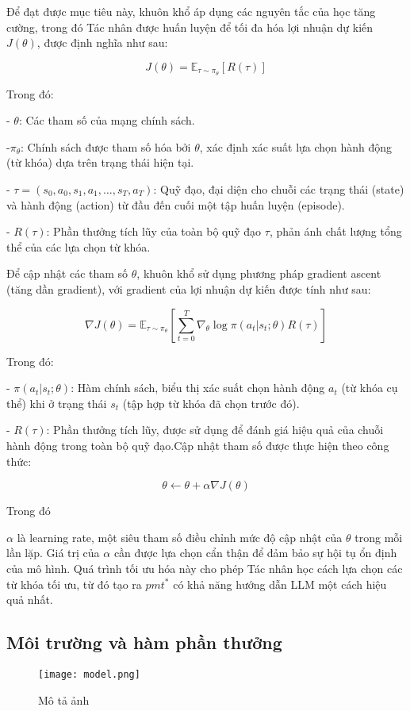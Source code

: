 \documentclass[a4paper,10pt]{article}
\begin{document}
Để đạt được mục tiêu này, khuôn khổ áp dụng các nguyên tắc của học tăng cường, trong đó Tác nhân được huấn luyện để tối đa hóa lợi nhuận dự kiến \(J(\theta)\), được định nghĩa như sau:

\[
J(\theta) = \mathbb{E}_{\tau \sim \pi_\theta} \left[ R(\tau) \right]
\]

Trong đó:

- \(\theta\): Các tham số của mạng chính sách.

-\(\pi_\theta\): Chính sách được tham số hóa bởi \(\theta\), xác định xác suất lựa chọn hành động (từ khóa) dựa trên trạng thái hiện tại.

- \(\tau = (s_0, a_0, s_1, a_1, \ldots, s_T, a_T)\): Quỹ đạo, đại diện cho chuỗi các trạng thái (state) và hành động (action) từ đầu đến cuối một tập huấn luyện (episode).

- \(R(\tau)\): Phần thưởng tích lũy của toàn bộ quỹ đạo \(\tau\), phản ánh chất lượng tổng thể của các lựa chọn từ khóa.

Để cập nhật các tham số \(\theta\), khuôn khổ sử dụng phương pháp gradient ascent (tăng dần gradient), với gradient của lợi nhuận dự kiến được tính như sau:

\[
\nabla J(\theta) = \mathbb{E}_{\tau \sim \pi_\theta} \left[ \sum_{t=0}^T \nabla_\theta \log \pi(a_t | s_t; \theta) R(\tau) \right]
\]

Trong đó:

- \(\pi(a_t | s_t; \theta)\): Hàm chính sách, biểu thị xác suất chọn hành động \(a_t\) (từ khóa cụ thể) khi ở trạng thái \(s_t\) (tập hợp từ khóa đã chọn trước đó).

- \(R(\tau)\): Phần thưởng tích lũy, được sử dụng để đánh giá hiệu quả của chuỗi hành động trong toàn bộ quỹ đạo.Cập nhật tham số được thực hiện theo công thức:

\[
\theta \leftarrow \theta + \alpha \nabla J(\theta)
\]

Trong đó 

\(\alpha\) là learning rate, một siêu tham số điều chỉnh mức độ cập nhật của \(\theta\) trong mỗi lần lặp. Giá trị của \(\alpha\) cần được lựa chọn cẩn thận để đảm bảo sự hội tụ ổn định của mô hình.
Quá trình tối ưu hóa này cho phép Tác nhân học cách lựa chọn các từ khóa tối ưu, từ đó tạo ra \(pmt^*\) có khả năng hướng dẫn LLM một cách hiệu quả nhất. 
\subsection{Môi trường và hàm phần thưởng}
\begin{figure}[h]
    \centering
    \texttt{[image: model.png]}
    \caption{Mô tả ảnh}
    \label{fig:label_anh}
\end{figure}
\end{document}
